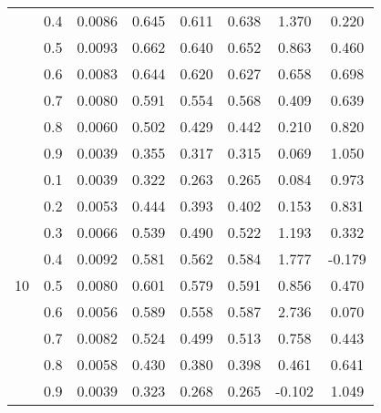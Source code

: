 \documentclass[11pt,a4paper]{report}
\begin{document}
\begin{longtable}{ | c | c || c | c | c | c | c | c | }
 & 0.4 & 0.0086 & 0.645 & 0.611 & 0.638 & 1.370 & 0.220 \\
 & 0.5 & 0.0093 & 0.662 & 0.640 & 0.652 & 0.863 & 0.460 \\
 & 0.6 & 0.0083 & 0.644 & 0.620 & 0.627 & 0.658 & 0.698 \\
 & 0.7 & 0.0080 & 0.591 & 0.554 & 0.568 & 0.409 & 0.639 \\
 & 0.8 & 0.0060 & 0.502 & 0.429 & 0.442 & 0.210 & 0.820 \\
 & 0.9 & 0.0039 & 0.355 & 0.317 & 0.315 & 0.069 & 1.050 \\
 \hline
\multirow{9}{*}{10} & 0.1 & 0.0039 & 0.322 & 0.263 & 0.265 & 0.084 & 0.973 \\
 & 0.2 & 0.0053 & 0.444 & 0.393 & 0.402 & 0.153 & 0.831 \\
 & 0.3 & 0.0066 & 0.539 & 0.490 & 0.522 & 1.193 & 0.332 \\
 & 0.4 & 0.0092 & 0.581 & 0.562 & 0.584 & 1.777 & -0.179 \\
 & 0.5 & 0.0080 & 0.601 & 0.579 & 0.591 & 0.856 & 0.470 \\
 & 0.6 & 0.0056 & 0.589 & 0.558 & 0.587 & 2.736 & 0.070 \\
 & 0.7 & 0.0082 & 0.524 & 0.499 & 0.513 & 0.758 & 0.443 \\
 & 0.8 & 0.0058 & 0.430 & 0.380 & 0.398 & 0.461 & 0.641 \\
 & 0.9 & 0.0039 & 0.323 & 0.268 & 0.265 & -0.102 & 1.049 \\
 \hline
\hline
\end{longtable}
\end{document}

